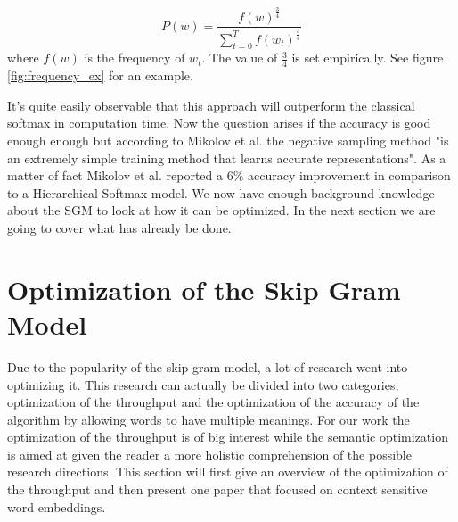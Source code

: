 { \begin{equation} \label{eq:unigram}
P(w)=\frac{f(w)^{\frac{3}{4}}}{\sum_{t=0}^{T} f(w_t)^{\frac{3}{4}}}
\end{equation}
where $f(w)$ is the frequency of $w_t$. The value of $\frac{3}{4}$ is set empirically. See figure \ref{fig:frequency_ex} for an example.

It's quite easily observable that this approach will outperform the classical softmax in computation time. Now the question arises if the accuracy is good enough enough but according to Mikolov et al. \cite{mikolov2} the negative sampling method "is an extremely simple training method that learns accurate representations". As a matter of fact Mikolov et al. \cite{mikolov2} reported a 6\% accuracy improvement in comparison to a Hierarchical Softmax model.
We now have enough background knowledge about the SGM to look at how it can be optimized. In the next section we are going to cover what has already be done.

\section{Optimization of the Skip Gram Model}
Due to the popularity of the skip gram model, a lot of research went into optimizing it. This research can actually be divided into two categories, optimization of the throughput and the optimization of the accuracy of the algorithm by allowing words to have multiple meanings. For our work the optimization of the throughput is of big interest while the semantic optimization is aimed at given the reader a more holistic comprehension of the possible research directions. 
This section will first give an overview of the optimization of the throughput and then present one paper that focused on context sensitive word embeddings. 

}
